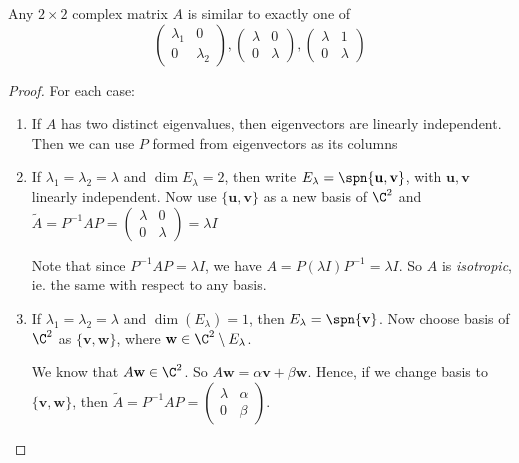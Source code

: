 \documentclass[a4paper]{article}
\begin{document}
\begin{thm}
  Any $2\times 2$ complex matrix $A$ is similar to exactly one of
  \[
    \begin{pmatrix}
      \lambda_1 & 0\\
      0 & \lambda_2
    \end{pmatrix},
    \begin{pmatrix}
      \lambda & 0\\
      0 & \lambda
    \end{pmatrix},
    \begin{pmatrix}
      \lambda & 1\\
      0 & \lambda
    \end{pmatrix}
  \]
\end{thm}
\begin{proof}
  For each case:
  \begin{enumerate}
    \item If $A$ has two distinct eigenvalues, then eigenvectors are linearly independent. Then we can use $P$ formed from eigenvectors as its columns
    \item If $\lambda_1=\lambda_2 = \lambda$ and $\dim E_\lambda = 2$, then write $E_\lambda = \spn\{\mathbf{u}, \mathbf{v}\}$, with $\mathbf{u}, \mathbf{v}$ linearly independent. Now use $\{\mathbf{u}, \mathbf{v}\}$ as a new basis of $\C^2$ and $\tilde{A} = P^{-1}AP =
      \begin{pmatrix}
        \lambda & 0\\
        0 & \lambda
      \end{pmatrix} = \lambda I$

      Note that since $P^{-1}AP = \lambda I$, we have $A = P(\lambda I)P^{-1} = \lambda I$. So $A$ is \emph{isotropic}, ie. the same with respect to any basis.
    \item If $\lambda_1 = \lambda_2 = \lambda$ and $\dim (E_\lambda) = 1$, then $E_\lambda = \spn\{\mathbf{v}\}$. Now choose basis of $\C^2$ as $\{\mathbf{v}, \mathbf{w}\}$, where $\mathbf{w}\in \C^2\setminus E_\lambda$.

      We know that $A\mathbf{w}\in \C^2$. So $A\mathbf{w} = \alpha \mathbf{v} + \beta \mathbf{w}$. Hence, if we change basis to $\{\mathbf{v}, \mathbf{w}\}$, then $\tilde{A} = P^{-1}AP =
      \begin{pmatrix}
        \lambda & \alpha\\
        0 & \beta
      \end{pmatrix}$.


\end{enumerate}
\end{proof}
\end{document}
